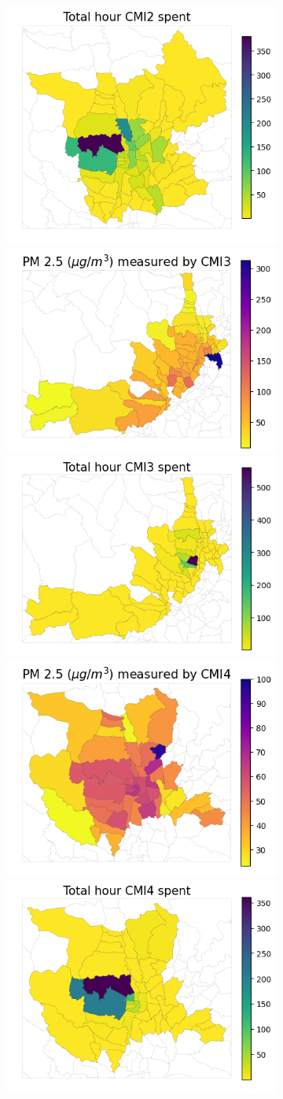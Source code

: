 \begin{figure}
\begin{subfigure}[t]{0.49\textwidth}
        \includegraphics[width=.5\linewidth]{figures/map/CMI2_time.png}
        \includegraphics[width=.5\linewidth]{figures/map/CMI3_PM25.png}%
        \includegraphics[width=.5\linewidth]{figures/map/CMI3_time.png}
        \includegraphics[width=.5\linewidth]{figures/map/CMI4_PM25.png}%
        \includegraphics[width=.5\linewidth]{figures/map/CMI4_time.png}

\end{subfigure}
\end{figure}
